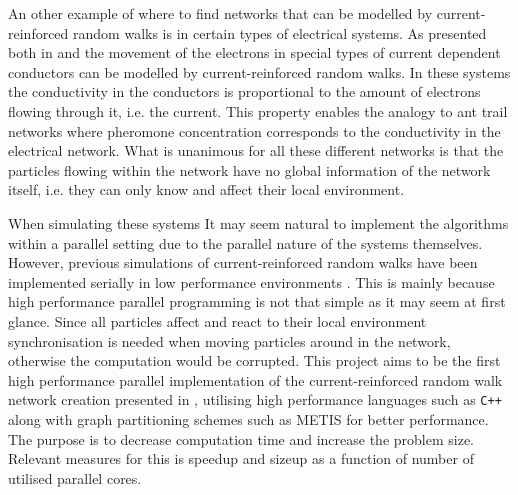 An other example of where to find networks that can be modelled by current-reinforced random walks is in certain types of electrical systems. As presented both in \cite{Sumpter} and \cite{Doyle} the movement of the electrons in special types of current dependent conductors can be modelled by current-reinforced random walks. In these systems the conductivity in the conductors is proportional to the amount of electrons flowing through it, i.e. the current. This property enables the analogy to ant trail networks where pheromone concentration corresponds to the conductivity in the electrical network. What is unanimous for all these different networks is that the particles flowing within the network have no global information of the network itself, i.e. they can only know and affect their local environment. 

When simulating these systems It may seem natural to implement the algorithms within a parallel setting due to the parallel nature of the systems themselves. However, previous simulations of current-reinforced random walks have been implemented serially in low performance environments \cite{Sumpter, Ma2012rib}. This is mainly because high performance parallel programming is not that simple as it may seem at first glance. Since all particles affect and react to their local environment synchronisation is needed when moving particles around in the network, otherwise the computation would be corrupted. This project aims to be the first high performance parallel implementation of the current-reinforced random walk network creation presented in \cite{Sumpter}, utilising high performance languages such as \texttt{C++} along with graph partitioning schemes such as METIS for better performance. The purpose is to decrease computation time and increase the problem size. Relevant measures for this is speedup and sizeup as a function of number of utilised parallel cores.